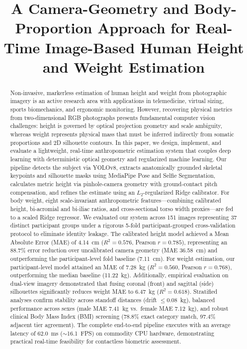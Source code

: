 \documentclass[conference]{IEEEtran}
\title{A Camera-Geometry and Body-Proportion Approach for Real-Time Image-Based Human Height and Weight Estimation}
\author{
\IEEEauthorblockN{Author Name 1\IEEEauthorrefmark{1}, Author Name 2\IEEEauthorrefmark{2}, Author Name 3\IEEEauthorrefmark{3}}
\IEEEauthorblockA{\textit{Department of Computer Science and Engineering}\\
\textit{Institution / University Name}\\
City, Postal Code, Country\\
Email: \{author1, author2, author3\}@institution.edu}
}
\begin{document}
\maketitle

\begin{abstract}
Non-invasive, markerless estimation of human height and weight from photographic imagery is an active research area with applications in telemedicine, virtual sizing, sports biomechanics, and ergonomic monitoring. However, recovering physical metrics from two-dimensional RGB photographs presents fundamental computer vision challenges: height is governed by optical projection geometry and scale ambiguity, whereas weight represents physical mass that must be inferred indirectly from somatic proportions and 2D silhouette contours. In this paper, we design, implement, and evaluate a lightweight, real-time anthropometric estimation system that couples deep learning with deterministic optical geometry and regularized machine learning. Our pipeline detects the subject via YOLOv8, extracts anatomically grounded skeletal keypoints and silhouette masks using MediaPipe Pose and Selfie Segmentation, calculates metric height via pinhole-camera geometry with ground-contact pitch compensation, and refines the estimate using an $L_2$-regularized Ridge calibrator. For body weight, eight scale-invariant anthropometric features---combining calibrated height, bi-acromial and bi-iliac ratios, and cross-sectional torso width proxies---are fed to a scaled Ridge regressor. We evaluated our system across 151 images representing 37 distinct participant groups under a rigorous 5-fold participant-grouped cross-validation protocol to eliminate identity leakage. The calibrated height model achieved a Mean Absolute Error (MAE) of 4.14~cm ($R^2=0.576$, Pearson $r=0.785$), representing an 88.7\% error reduction over uncalibrated camera geometry (MAE 36.58~cm) and outperforming the participant-level fold baseline (7.11~cm). For weight estimation, our participant-level model attained an MAE of 7.28~kg ($R^2=0.560$, Pearson $r=0.768$), outperforming the median baseline (11.22~kg). Additionally, empirical evaluation on dual-view imagery demonstrated that fusing coronal (front) and sagittal (side) silhouettes significantly reduces weight MAE to 6.47~kg ($R^2=0.618$). Stratified analyses confirm stability across standoff distances (drift $\le 0.08$~kg), balanced performance across sexes (male MAE 7.41~kg vs.~female MAE 7.12~kg), and robust clinical Body Mass Index (BMI) screening (78.8\% exact category match, 97.4\% adjacent tier agreement). The complete end-to-end pipeline executes with an average latency of 62.0~ms ($\sim$16.1~FPS) on commodity CPU hardware, demonstrating practical real-time feasibility for contactless biometric assessment.
\end{abstract}
\end{document}
